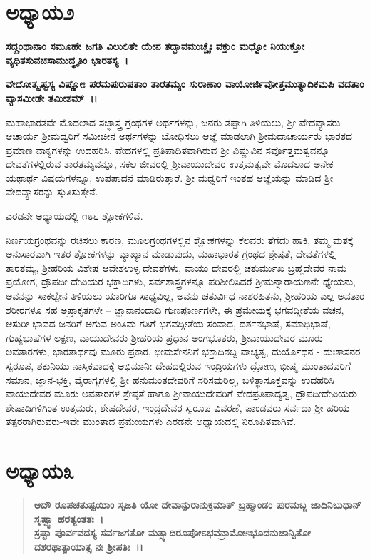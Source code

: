 \section*{ಅಧ್ಯಾಯ\enginline{-}೨}

\textbf{ಸದ್ಗ್ರಂಥಾನಾಂ ಸಮೂಹೇ ಜಗತಿ ವಿಲುಲಿತೇ ಯೇನ ತದ್ಭಾವಮುಚ್ಚೈಃ ವಕ್ತುಂ ಮಧ್ವೋ ನಿಯುಕ್ತೋ ವ್ಯಧಿತಸುವಚಸಾಮುದ್ಧೃತಿಂ ಭಾರತಸ್ಯ~।}

\noindent
\textbf{ವೇದೋತ್ಕೃಷ್ಟಸ್ಯ ವಿಷ್ಣೋಃ ಪರಮಪುರುಷತಾಂ ತಾರತಮ್ಯಂ ಸುರಾಣಾಂ ವಾಯೋರ್ಜಿವೋ\-ತ್ತಮುತ್ಯಾದಿಕಮಪಿ ವದತಾಂ ವ್ಯಾಸಮೀಡೇ ತಮೀಶಮ್~।। }

ಮಹಾಭಾರತವೇ ಮೊದಲಾದ ಸಚ್ಛಾಸ್ತ್ರ ಗ್ರಂಥಗಳ ಅರ್ಥಗಳನ್ನು, ಜನರು ತಪ್ಪಾಗಿ ತಿಳಿಯಲು, ಶ‍್ರೀ ವೇದವ್ಯಾಸರು ಆಚಾರ್ಯ ಶ‍್ರೀಮಧ್ವರಿಗೆ ಸಮೀಚೀನ ಅರ್ಥಗಳನ್ನು ಬೋಧಿಸಲು ಆಜ್ಞೆ ಮಾಡಲಾಗಿ ಶ‍್ರೀಮದಾಚಾರ್ಯರು ಭಾರತದ ಪ್ರಮಾಣ ವಾಕ್ಯಗಳನ್ನು ಉದಹರಿಸಿ, ವೇದಗಳಲ್ಲಿ ಪ್ರತಿಪಾದಿತವಾಗಿರುವ ಶ‍್ರೀ ವಿಷ್ಣುವಿನ ಸರ್ವೊತ್ತಮತ್ವವನ್ನೂ ದೇವತೆಗಳಲ್ಲಿರುವ ತಾರತಮ್ಯವನ್ನೂ, ಸಕಲ ಜೀವರಲ್ಲಿ ಶ‍್ರೀವಾಯುದೇವರ ಉತ್ತಮತ್ವವೇ ಮೊದಲಾದ ಅನೇಕ ಯಥಾರ್ಥ ವಿಷಯಗಳನ್ನೂ, ಉಪಪಾದನೆ ಮಾಡಿರುತ್ತಾರೆ. ಶ‍್ರೀ ಮಧ್ವರಿಗೆ ಇಂತಹ ಆಜ್ಞೆಯನ್ನು ಮಾಡಿದ ಶ‍್ರೀ ವೇದವ್ಯಾಸರನ್ನು ಸ್ತುತಿಸುತ್ತೇನೆ.

ಎರಡನೇ ಅಧ್ಯಾಯದಲ್ಲಿ ೧೮೬ ಶ್ಲೋಕಗಳಿವೆ.

ನಿರ್ಣಯಗ್ರಂಥವನ್ನು ರಚಿಸಲು ಕಾರಣ, ಮೂಲಗ್ರಂಥಗಳಲ್ಲಿನ ಶ್ಲೋಕಗಳನ್ನು ಕೆಲವರು ತೆಗೆದು ಹಾಕಿ, ತಮ್ಮ ಮತಕ್ಕೆ ಅನುಸಾರವಾಗಿ ಇತರ ಶ್ಲೋಕಗಳನ್ನು ವ್ಯಾಖ್ಯಾನ ಮಾಡುವುದು, ಮಹಾಭಾರತ ಗ್ರಂಥದ ಶ್ರೇಷ್ಠತೆ, ದೇವತೆಗಳಲ್ಲಿ ತಾರತಮ್ಯ, ಶ‍್ರೀಹರಿಯ ವಿಶೇಷ ಆವೇಶಉಳ್ಳ ದೇವತೆಗಳು, ವಾಯು ದೇವರಲ್ಲಿ ಚತುರ್ಮುಖ ಬ್ರಹ್ಮದೇವರ ನಾಮ ಪ್ರಯೋಗ, ದ್ರೌಪದೀ ದೇವಿಯರ ಭಕ್ತಾದಿಗಳು, ಸರ್ವಶಾಸ್ತ್ರಗಳನ್ನೂ ಪರಿಶೀಲಿಸಿದರೆ ಶ‍್ರೀಮನ್ನಾರಾಯಣನೇ ಧ್ಯೇಯನು, ಅವನನ್ನು ಸಾಕಲ್ವೇನ ತಿಳಿಯಲು ಯಾರಿಗೂ ಸಾಧ್ಯವಿಲ್ಲ, ಅವನು ಚತುರ್ವಿಧ ನಾಶರಹಿತನು, ಶ‍್ರೀಹರಿಯ ಎಲ್ಲ ಅವತಾರ ಶರೀರಗಳೂ ಸಹ ಅಪ್ರಾಕೃತಗಳೇ – ಜ್ಞಾನಾನಂದಾದಿ ಗುಣಪೂರ್ಣಗಳೇ, ಈ ಪ್ರಮೇಯಕ್ಕೆ ಭಗವದ್ಗೀತೆಯ ವಚನ, ಆಸುರೀ ಭಾವದ ಜನರಿಗೆ ಅಗುವ ಅಂತಿಮ ಗತಿಗೆ ಭಗವದ್ಗೀತೆಯ ಸಂವಾದ, ದರ್ಶನಭಾಷೆ, ಸಮಾಧಿಭಾಷೆ, ಗುಹ್ಯಭಾಷೆಗಳ ಲಕ್ಷಣ, ವಾಯುದೇವರು ಶ‍್ರೀಹರಿಯ ಪ್ರಧಾನ ಅಂಗಭೂತರು, ಶ‍್ರೀವಾಯುದೇವರ ಮೂರು ಅವತಾರಗಳು, ಭಾರತಾರ್ಥವು ಮೂರು ಪ್ರಕಾರ, ಭೀಮಸೇನನಿಗೆ ಭಕ್ತಾದಿಶಬ್ದ ವಾಚ್ಯತ್ವ, ದುರ್ಯೊಧನ - ದುಃಶಾಸನರ ಸ್ವರೂಪ, ಶಕುನಿಯು ನಾಸ್ತಿಕವಾದಕ್ಕೆ ಅಭಿಮಾನಿ: ದೇಹದಲ್ಲಿರುವ ಇಂದ್ರಿಯಗಳು ದ್ರೋಣ, ಭೀಷ್ಮ ಮುಂತಾದವರಿಗೆ ಸಮಾನ, ಜ್ಞಾನ-ಭಕ್ತಿ, ವೈರಾಗ್ಯಗಳಲ್ಲಿ ಶ‍್ರೀ ಹನುಮಂತದೇವರಿಗೆ ಸರಿಸಮರಿಲ್ಲ, ಬಳಿತ್ಥಾಸೂಕ್ತವನ್ನು ಉದಹರಿಸಿ ವಾಯುದೇವರ ಮೂರು ಅವತಾರಗಳ ಶ್ರೇಷ್ಠತೆ ಹಾಗೂ ಶ‍್ರೀವಾಯುದೇವರಿಗೆ ವೇದಪ್ರತಿಪಾದ್ಯತ್ವ, ದ್ರೌಪದೀದೇವಿಯರು ಶೇಷಾದಿಗಳಿಗಿಂತ ಉತ್ತಮರು, ಶೇಷದೇವರ, ಇಂದ್ರದೇವರ ಸ್ವರೂಪ ವಿವರಣೆ, ಪಾಂಡವರು ಸರ್ವದಾ ಶ‍್ರೀ ಹರಿಯ ತತ್ಪರರಾಗಿರುವರು-ಇವೇ ಮುಂತಾದ ಪ್ರಮೇಯಗಳು ಎರಡನೇ ಅಧ್ಯಾಯದಲ್ಲಿ ನಿರೂಪಿತವಾಗಿವೆ.


\section*{ಅಧ್ಯಾಯ\enginline{-}೩}

\begin{verse}
\textbf{ಆದೌ ರೂಪಚತುಷ್ಟಯಿಾಂ ಸೃಜತಿ ಯೋ ದೇವಾನ್ಪುರಾನುಕ್ರಮಾತ್ ಬ್ರಹ್ಮಾಂಡಂ ಪುರಮಬ್ಜ ಜಾದಿನಿಬುಧಾನ್ ಸೃಷ್ಟ್ವಾ ಹರತ್ಯಂತತಃ~।}\\\textbf{ಸ್ರಷ್ಟಾ ಪೂರ್ವವದಸ್ಯ ಸರ್ವಜಗತೋ ಮತ್ಸ್ಯಾದಿರೂಪೋಽಭವನ್\break ರಾಮೋsಭೂದನುಜಾನ್ವಿತೋ ದಶರಥಾತ್ಪಾಯಾತ್ಸ ನಃ ಶ‍್ರೀಪತಿಃ~।।}
\end{verse}

